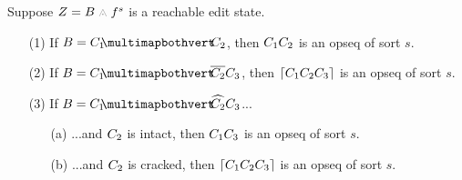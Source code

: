 \begin{theorem}
  Suppose $Z = \zipper{\subject}{\tfrelem^s}$ is a reachable edit state.
  \begin{enumerate}
  \item[(1)] If $\subject = \pointing{\selection_1}{\selection_2}$,
    then $C_1C_2$ is an opseq of sort $s$.
  \item[(2)] If $\subject = \selecting{\selection_1}{\selection_2}{\selection_3}$,
    then $\left\lceil C_1C_2C_3\right\rceil$ is an opseq of sort $s$.
  \item[(3)] If $\subject = \restructuring{\selection_1}{\selection_2}{\selection_3}$...
    \begin{enumerate}
      \item[(a)] ...and $C_2$ is intact, then
        $C_1C_3$ is an opseq of sort $s$.
      \item[(b)] ...and $C_2$ is cracked, then
        $\left\lceil C_1C_2C_3\right\rceil$ is an opseq of sort $s$.
    \end{enumerate}
  \end{enumerate}
\end{theorem}

\begin{theorem}

\end{theorem}

